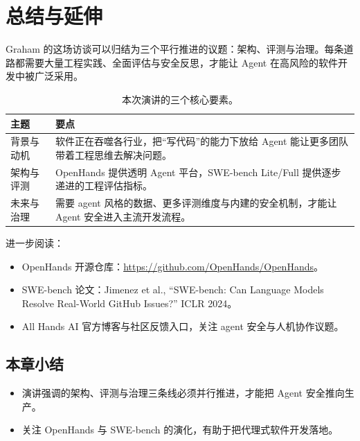 \section{总结与延伸}
Graham 的这场访谈可以归结为三个平行推进的议题：架构、评测与治理。每条道路都需要大量工程实践、全面评估与安全反思，才能让 Agent 在高风险的软件开发中被广泛采用。

\begin{table}[H]
\centering
\begin{tabular}{p{} p{}}
\toprule
主题 & 要点 \\
\midrule
背景与动机 & 软件正在吞噬各行业，把“写代码”的能力下放给 Agent 能让更多团队带着工程思维去解决问题。 \\
\midrule
架构与评测 & OpenHands 提供透明 Agent 平台，SWE-bench Lite/Full 提供逐步递进的工程评估指标。 \\
\midrule
未来与治理 & 需要 agent 风格的数据、更多评测维度与内建的安全机制，才能让 Agent 安全进入主流开发流程。 \\
\bottomrule
\end{tabular}
\caption{本次演讲的三个核心要素。}
\end{table}

进一步阅读：
\begin{itemize}
    \item OpenHands 开源仓库：\href{https://github.com/OpenHands/OpenHands}{https://github.com/OpenHands/OpenHands}。
    \item SWE-bench 论文：Jimenez et al., ``SWE-bench: Can Language Models Resolve Real-World GitHub Issues?'' ICLR 2024。
    \item All Hands AI 官方博客与社区反馈入口，关注 agent 安全与人机协作议题。
\end{itemize}

\subsection{本章小结}
\begin{itemize}
    \item 演讲强调的架构、评测与治理三条线必须并行推进，才能把 Agent 安全推向生产。
    \item 关注 OpenHands 与 SWE-bench 的演化，有助于把代理式软件开发落地。
\end{itemize}


